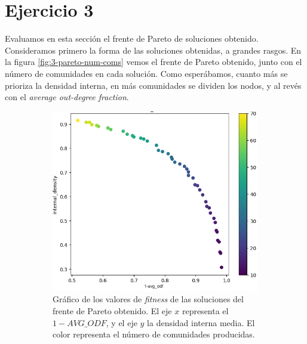 \section{Ejercicio 3}\label{sec:ej3}

Evaluamos en esta sección el frente de Pareto de soluciones obtenido.
Consideramos primero la forma de las soluciones obtenidas, a grandes rasgos. En
la figura \ref{fig:3-pareto-num-coms} vemos el frente de Pareto obtenido,
junto con el número de comunidades en cada solución. Como esperábamos, cuanto
más se prioriza la densidad interna, en más comunidades se dividen los nodos, y
al revés con el \emph{average out-degree fraction}.

\begin{figure}[!htb]
  \centering
  \begin{subfigure}{.48\textwidth}
    \centering
    \includegraphics[width=\linewidth]{img/3_num_communities_pareto_1}
    \caption{Gráfico de los valores de \emph{fitness} de las soluciones del
    frente de Pareto obtenido. El eje $x$ representa el \(1-AVG\_ODF\), y el
    eje \(y\) la densidad interna media. El color representa el número de
    comunidades producidas.}
    \label{fig:3-pareto-num-coms-1}
  \end{subfigure}%
  \hfill
  \begin{subfigure}{.48\textwidth}
    \centering

\end{subfigure}
\end{figure}
